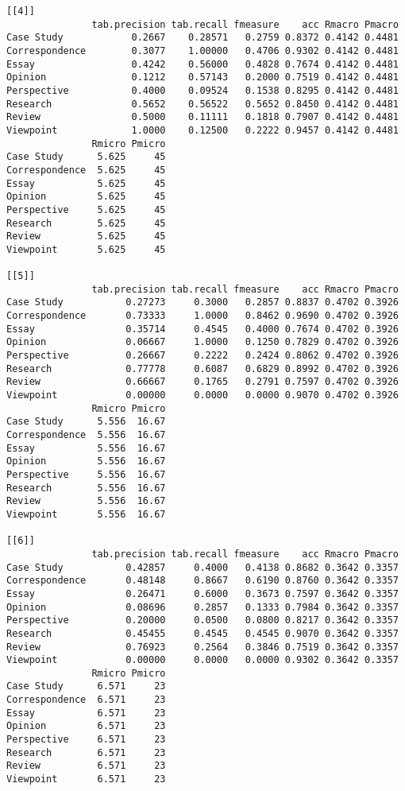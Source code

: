 \documentclass[]{article}
\begin{document}
\begin{lstlisting}[frame=single]
[[4]]
               tab.precision tab.recall fmeasure    acc Rmacro Pmacro
Case Study            0.2667    0.28571   0.2759 0.8372 0.4142 0.4481
Correspondence        0.3077    1.00000   0.4706 0.9302 0.4142 0.4481
Essay                 0.4242    0.56000   0.4828 0.7674 0.4142 0.4481
Opinion               0.1212    0.57143   0.2000 0.7519 0.4142 0.4481
Perspective           0.4000    0.09524   0.1538 0.8295 0.4142 0.4481
Research              0.5652    0.56522   0.5652 0.8450 0.4142 0.4481
Review                0.5000    0.11111   0.1818 0.7907 0.4142 0.4481
Viewpoint             1.0000    0.12500   0.2222 0.9457 0.4142 0.4481
               Rmicro Pmicro
Case Study      5.625     45
Correspondence  5.625     45
Essay           5.625     45
Opinion         5.625     45
Perspective     5.625     45
Research        5.625     45
Review          5.625     45
Viewpoint       5.625     45

[[5]]
               tab.precision tab.recall fmeasure    acc Rmacro Pmacro
Case Study           0.27273     0.3000   0.2857 0.8837 0.4702 0.3926
Correspondence       0.73333     1.0000   0.8462 0.9690 0.4702 0.3926
Essay                0.35714     0.4545   0.4000 0.7674 0.4702 0.3926
Opinion              0.06667     1.0000   0.1250 0.7829 0.4702 0.3926
Perspective          0.26667     0.2222   0.2424 0.8062 0.4702 0.3926
Research             0.77778     0.6087   0.6829 0.8992 0.4702 0.3926
Review               0.66667     0.1765   0.2791 0.7597 0.4702 0.3926
Viewpoint            0.00000     0.0000   0.0000 0.9070 0.4702 0.3926
               Rmicro Pmicro
Case Study      5.556  16.67
Correspondence  5.556  16.67
Essay           5.556  16.67
Opinion         5.556  16.67
Perspective     5.556  16.67
Research        5.556  16.67
Review          5.556  16.67
Viewpoint       5.556  16.67

[[6]]
               tab.precision tab.recall fmeasure    acc Rmacro Pmacro
Case Study           0.42857     0.4000   0.4138 0.8682 0.3642 0.3357
Correspondence       0.48148     0.8667   0.6190 0.8760 0.3642 0.3357
Essay                0.26471     0.6000   0.3673 0.7597 0.3642 0.3357
Opinion              0.08696     0.2857   0.1333 0.7984 0.3642 0.3357
Perspective          0.20000     0.0500   0.0800 0.8217 0.3642 0.3357
Research             0.45455     0.4545   0.4545 0.9070 0.3642 0.3357
Review               0.76923     0.2564   0.3846 0.7519 0.3642 0.3357
Viewpoint            0.00000     0.0000   0.0000 0.9302 0.3642 0.3357
               Rmicro Pmicro
Case Study      6.571     23
Correspondence  6.571     23
Essay           6.571     23
Opinion         6.571     23
Perspective     6.571     23
Research        6.571     23
Review          6.571     23
Viewpoint       6.571     23


\end{lstlisting}
\end{document}
